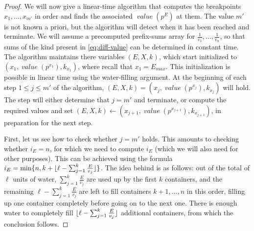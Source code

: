 \documentclass[sigconf,nonacm]{aamas}
\DeclarePairedDelimiter\floor{\lfloor}{\rfloor}
\DeclareMathOperator{\valueText}{\textit{value}}
\newcommand{\val}[1]{\valueText({#1})}
\begin{document}
\begin{proof}
We will now give a linear-time algorithm that computes the breakpoints $x_1, \dots, x_{m'}$ in
order and finds the associated $\val{p^E}$ at them. The value $m'$ is not known a priori, but the algorithm will detect when it has been reached and terminate. We will assume a precomputed prefix-sums array for $\frac{1}{v_1}, \dots, \frac{1}{v_n}$, so that sums of the kind present in \cref{eq:diff-value} can be determined in constant time. The algorithm maintains there variables $(E, X, k)$, which start initialized to $(x_1, \val{p^{x_1}}, k_{x_1})$, where recall that $x_1 = E_\mathit{max}$. This initialization is possible in linear time using the water-filling argument.
At the beginning of each step $1 \leq j \leq m'$ of the algorithm, $(E, X, k) = (x_j, \val{p^{x_j}}, k_{x_j})$ will hold. The step will either determine that $j = m'$ and terminate, or compute the required values and set $(E, X, k) \gets (x_{j + 1}, \val{p^{x_{j + 1}}}, k_{x_{j + 1}})$, in preparation for the next step.

First, let us see how to check whether $j = m'$ holds. This amounts to checking whether $i_E = n$, for which we need to compute $i_E$ (which we will also need for other purposes).
This can be achieved using the formula $i_E = \min\{n, k + \floor{\ell - \sum_{j = 1}^k\frac{E}{v_j}}\}$. The idea behind is as follows: out of the total of $\ell$ units of water, $\sum_{j = 1}^k\frac{E}{v_j}$ are used up by the first $k$ containers, and the remaining $\ell - \sum_{j = 1}^k\frac{E}{v_j}$ are left to fill containers $k + 1, \dots, n$ in this order, filling up one container completely before going on to the next one. There is enough water to completely fill $\floor{\ell - \sum_{j = 1}^k\frac{E}{v_j}}$ additional containers, from which the conclusion follows.


\end{proof}
\end{document}
